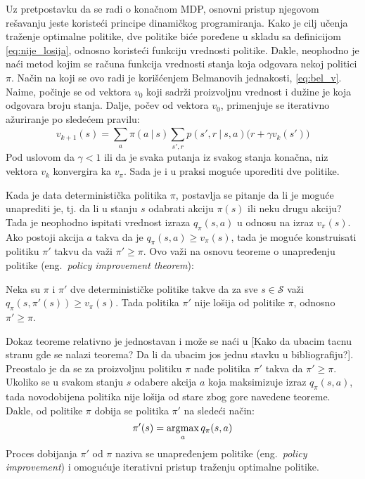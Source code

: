 Uz pretpostavku da se radi o konačnom MDP, osnovni pristup njegovom rešavanju jeste koristeći principe dinamičkog programiranja. Kako je cilj učenja traženje optimalne politike, dve politike biće poređene u skladu sa definicijom \eqref{eq:nije_losija}, odnosno koristeći funkciju vrednosti politike. Dakle, neophodno je naći metod kojim se računa funkcija vrednosti stanja koja odgovara nekoj politici $\pi$.  Način na koji se ovo radi je korišćenjem Belmanovih jednakosti, \eqref{eq:bel_v}. Naime, počinje se od vektora $v_0$ koji sadrži proizvoljnu vrednost i dužine je koja odgovara broju stanja. Dalje, počev od vektora $v_0$, primenjuje se iterativno ažuriranje po sledećem pravilu:
\begin{equation}
		v_{k+1}(s) = \sum_{a}^{} \pi(a~|~s)\sum_{s', r}^{}p(s', r~|~s, a) \big( r+\gamma v_k(s') \big)
\end{equation}
Pod uslovom da $\gamma < 1$ ili da je svaka putanja iz svakog stanja konačna, niz vektora $v_k$ konvergira ka $v_{\pi}$. Sada je i u praksi moguće uporediti dve politike.
\par 
Kada je data deterministička politika $\pi$, postavlja se pitanje da li je moguće unaprediti je, tj. da li u stanju $s$ odabrati akciju $\pi(s)$ ili neku drugu akciju? Tada je neophodno ispitati vrednost izraza $q_{\pi}(s,a)$ u odnosu na izraz $v_{\pi}(s)$. Ako postoji akcija $a$ takva da je $q_{\pi}(s, a) \geq v_{\pi}(s)$, tada je moguće konstruisati politiku $\pi'$ takvu da važi $\pi' \geq \pi$. Ovo važi na osnovu teoreme o unapređenju politike (eng.~{\em policy improvement theorem}):
\begin{theorem*}
	Neka su $\pi$ i $\pi'$ dve determinističke politike takve da za sve $s \in \mathcal{S}$ važi $q_{\pi}(s, \pi'(s)) \geq v_{\pi}(s)$. Tada politika $\pi'$ nije lošija od politike $\pi$, odnosno $\pi' \geq \pi$.
\end{theorem*}
Dokaz teoreme relativno je jednostavan i može se naći u [Kako da ubacim tacnu stranu gde se nalazi teorema? Da li da ubacim jos jednu stavku u bibliografiju?].
Preostalo je da se za proizvoljnu politiku $\pi$ nađe politika $\pi'$ takva da $\pi' \geq \pi$. Ukoliko se u svakom stanju $s$ odabere akcija $a$ koja maksimizuje izraz $q_{\pi}(s, a)$, tada novodobijena politika nije lošija od stare zbog gore navedene teoreme. Dakle, od politike $\pi$ dobija se politika $\pi'$ na sledeći način:
\begin{equation}
	\pi'(s) = \operatorname*{\arg\!\max}_a q_{\pi}(s, a)
\end{equation}
Proces dobijanja $\pi'$ od $\pi$  naziva se unapređenjem politike (eng.~{\em policy improvement}) i omogućuje iterativni pristup traženju optimalne politike. 

